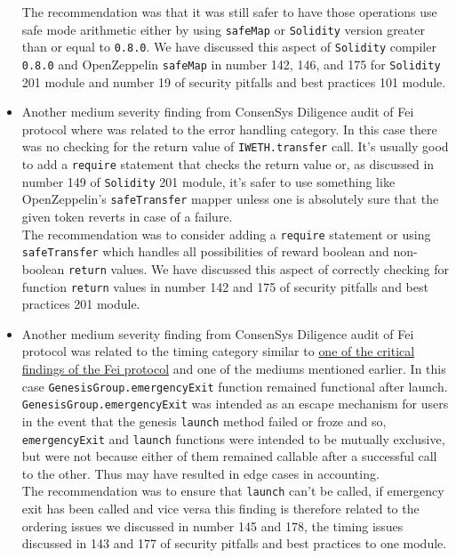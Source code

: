 \begin{itemize}
  The recommendation was that it was still safer to have those
  operations use safe mode arithmetic either by using \texttt{safeMap}
  or \texttt{Solidity} version greater than or equal to \texttt{0.8.0}.
  We have discussed this aspect of \texttt{Solidity} compiler
  \texttt{0.8.0} and OpenZeppelin \texttt{safeMap} in number 142, 146,
  and 175 for \texttt{Solidity} 201 module and number 19 of security
  pitfalls and best practices 101 module.
\item
  Another medium severity finding from ConsenSys Diligence audit of Fei
  protocol where was related to the error handling category. In this
  case there was no checking for the return value of
  \texttt{IWETH.transfer} call. It's usually good to add a
  \texttt{require} statement that checks the return value or, as
  discussed in number 149 of \texttt{Solidity} 201 module, it's safer to
  use something like OpenZeppelin's \texttt{safeTransfer} mapper unless
  one is absolutely sure that the given token reverts in case of a
  failure.\\

  The recommendation was to consider adding a \texttt{require} statement
  or using \texttt{safeTransfer} which handles all possibilities of
  reward boolean and non-boolean \texttt{return} values. We have
  discussed this aspect of correctly checking for function
  \texttt{return} values in number 142 and 175 of security pitfalls and
  best practices 201 module.
\item
  Another medium severity finding from ConsenSys Diligence audit of Fei
  protocol was related to the timing category similar to
  \href{5.1_Criticals.md\#Fei}{one of the critical findings of the Fei
  protocol} and one of the mediums mentioned earlier. In this case
  \texttt{GenesisGroup.emergencyExit} function remained functional after
  launch. \texttt{GenesisGroup.emergencyExit} was intended as an escape
  mechanism for users in the event that the genesis \texttt{launch}
  method failed or froze and so, \texttt{emergencyExit} and
  \texttt{launch} functions were intended to be mutually exclusive, but
  were not because either of them remained callable after a successful
  call to the other. Thus may have resulted in edge cases in
  accounting.\\

  The recommendation was to ensure that \texttt{launch} can't be called,
  if emergency exit has been called and vice versa this finding is
  therefore related to the ordering issues we discussed in number 145
  and 178, the timing issues discussed in 143 and 177 of security
  pitfalls and best practices to one module.
\end{itemize}

